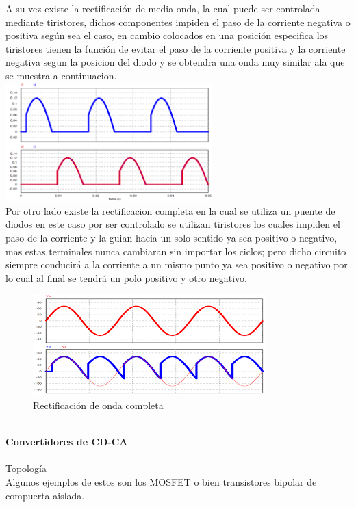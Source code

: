 \documentclass[12pt]{report}
\begin{document}
 A su vez existe la rectificación de media onda, la cual puede ser controlada mediante tiristores, dichos componentes impiden el paso de la corriente negativa o positiva según sea el caso, en cambio colocados en una posición especifica los tiristores tienen la función de evitar  el paso de la corriente positiva  y la corriente negativa segun la posicion del diodo y se obtendra una onda muy similar ala que se muestra a continuacion.\\
 \includegraphics[width=8cm]{images.png} \\
 \newpage
 Por otro lado existe la rectificacion completa en la cual se utiliza un puente de diodos en este caso por ser controlado se utilizan tiristores los cuales impiden el paso de la corriente y la guian hacia un solo sentido ya sea positivo o negativo, mas estas terminales nunca cambiaran sin importar los ciclos; pero dicho circuito siempre conducirá a la corriente a un mismo punto ya sea positivo o negativo por lo cual al final se tendrá un polo positivo y otro negativo.\\
 \begin{figure}[hbtp]
 \centering
 \includegraphics[scale=1]{completa.png}
 \caption{Rectificación de onda completa } 
 \end{figure}\\
 {\huge \textbf{Convertidores de CD-CA}\\}\\
 
  {\Large Topología}\\
 Algunos ejemplos de estos son los MOSFET o bien transistores bipolar de compuerta aislada.\\\\
 
\end{document}
